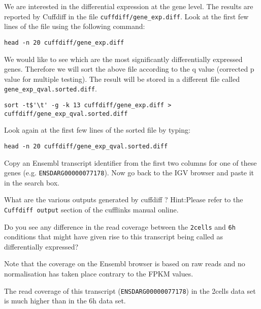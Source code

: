 \begin{steps}
We are interested in the differential expression at the gene level. The results
are reported by Cuffdiff in the file \texttt{cuffdiff/gene\_exp.diff}. 
Look at the first few lines of the file using the following command:
\begin{lstlisting}
head -n 20 cuffdiff/gene_exp.diff
\end{lstlisting}

We would like to see which are the most significantly differentially expressed
genes. Therefore we will sort the above file according to the q value
(corrected p value for multiple testing). The result will be stored in a
different file called \texttt{gene\_exp\_qval.sorted.diff}.
\begin{lstlisting}
sort -t$'\t' -g -k 13 cuffdiff/gene_exp.diff > cuffdiff/gene_exp_qval.sorted.diff
\end{lstlisting}

Look again at the first few lines of the sorted file by typing:
\begin{lstlisting}
head -n 20 cuffdiff/gene_exp_qval.sorted.diff
\end{lstlisting}

Copy an Ensembl transcript identifier from the first two columns for one of
these genes (e.g. \texttt{ENSDARG00000077178}). Now go back to the IGV browser
and paste it in the search box.
\end{steps}

\begin{questions}
What are the various outputs generated by cuffdiff ? 
Hint:Please refer to the  \texttt{Cuffdiff output} section of the cufflinks manual online.

Do you see any difference in the read coverage between the \texttt{2cells} and
\texttt{6h} conditions that might have given rise to this transcript being
called as differentially expressed?
\begin{warning}
Note that the coverage on the Ensembl browser is based on raw reads and no
normalisation has taken place contrary to the FPKM values.
\end{warning}

\begin{answer}
The read coverage of this transcript (\texttt{ENSDARG00000077178}) in the 2cells
data set is much higher than in the 6h data set.
\end{answer}

\end{questions}

